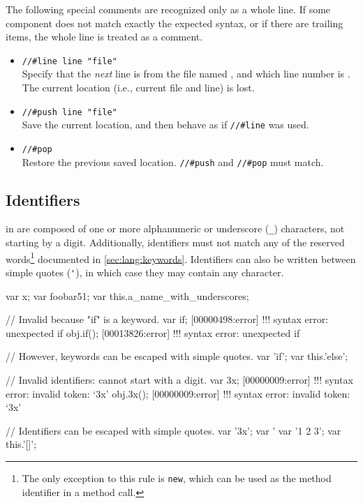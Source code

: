 The following special comments are recognized only as a whole line.
If some component does not match exactly the expected syntax, or if
there are trailing items, the whole line is treated as a comment.
\begin{itemize}
\item \lstinline|//#line line "file"|\\
  Specify that the \emph{next} line is from the file named ,
  and which line number is .  The current location (i.e.,
  current file and line) is lost.

\item \lstinline|//#push line "file"|\\
  Save the current location, and then behave as if \lstinline|//#line|
  was used.

\item \lstinline|//#pop|\\
  Restore the previous saved location.  \lstinline|//#push| and
  \lstinline|//#pop| must match.
\end{itemize}


\subsection{Identifiers}
\label{sec:lang:id}


 in \us are composed of one or more alphanumeric or
underscore (\lstinline|_|) characters, not starting by a digit.
Additionally, identifiers must not match any of the \us reserved
words\footnote{
  The only exception to this rule is \lstinline{new}, which can be
  used as the method identifier in a method call.
} documented in \autoref{sec:lang:keywords}. Identifiers can also be written
between simple quotes (\lstinline|'|), in which case they may contain any
character.

\begin{urbiscript}
var x;
var foobar51;
var this.a_name_with_underscores;

// Invalid because "if" is a keyword.
var if;
[00000498:error] !!! syntax error: unexpected if
obj.if();
[00013826:error] !!! syntax error: unexpected if

// However, keywords can be escaped with simple quotes.
var 'if';
var this.'else';

// Invalid identifiers: cannot start with a digit.
var 3x;
[00000009:error] !!! syntax error: invalid token: `3x'
obj.3x();
[00000009:error] !!! syntax error: invalid token: `3x'

// Identifiers can be escaped with simple quotes.
var '3x';
var '%
var '1 2 3';
var this.'[]';
\end{urbiscript}

